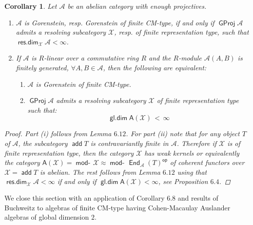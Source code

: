 \documentclass[oneside, a4paper,reqno]{amsart}
\numberwithin{equation}{section}
\newtheorem{cor}[thm]{Corollary}
\theoremstyle{definition}
\begin{document}
\begin{cor} Let ${\mathscr A}$ be an abelian category with enough projectives.
\begin{enumerate}
\item  ${\mathscr A}$ is  Gorenstein, resp. Gorenstein of finite CM-type, if and only if ${\operatorname{\mathsf{GProj}}\nolimits}{\mathscr A}$ admits a resolving subcategory ${\mathcal X}$, resp.  of finite representation type, such that $\operatorname*{\mathsf{res.dim}}_{\mathcal X}{\mathscr A} < \infty$.
\item  If ${\mathscr A}$ is $R$-linear over a commutative ring $R$ and the $R$-module ${\mathscr A}(A,B)$ is finitely generated, $\forall A,B \in {\mathscr A}$, then the following are equivalent:
\begin{enumerate}
\item ${\mathscr A}$ is  Gorenstein of finite CM-type.
\item ${\operatorname{\mathsf{GProj}}\nolimits}{\mathscr A}$ admits a resolving subcategory ${\mathcal X}$ of finite representation type such that:
    \[
    \operatorname*{\mathsf{gl.dim}}\mathsf{A}({\mathcal X}) \, < \, \infty
    \]
\end{enumerate}
\end{enumerate}
\begin{proof} Part (i) follows from Lemma $6.12$. For part (ii) note that for any object $T$ of ${\mathscr A}$, the subcategory $\operatorname*{\mathsf{add}} T$ is contravariantly finite in ${\mathscr A}$. Therefore if ${\mathcal X}$ is of finite representation type, then the category ${\mathcal X}$ has weak kernels or equivalently the category $\mathsf{A}({\mathcal X}) = \operatorname*{\mathsf{mod}-\!}{\mathcal X} \approx \operatorname*{\mathsf{mod}-\!}\operatorname*{\mathsf{End}}_{\mathscr A}(T)^\operatorname*{\mathsf{op}}$  of coherent functors over ${\mathcal X} = \operatorname*{\mathsf{add}} T$ is abelian.   The rest follows from Lemma $6.12$ using that $\operatorname*{\mathsf{res.dim}}_{\mathcal X}{\mathscr A} < \infty$ if and only if $\operatorname*{\mathsf{gl.dim}}\mathsf{A}({\mathcal X}) < \infty$, see Proposition $6.4$.
\end{proof}
\end{cor}

We close this section with an application of Corollary $6.8$ and
results of Buchweitz \cite{Buchweitz} to algebras of finite CM-type
having Cohen-Macaulay Auslander algebras of global dimension $2$.
\end{document}
